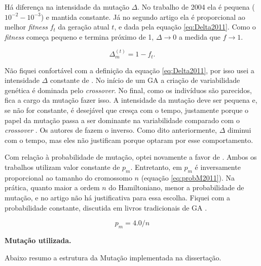 	Há diferença na intensidade da mutação $\Delta$. No trabalho de 2004 ela é pequena ($10^{-2}-10^{-3}$) e mantida constante. Já no segundo artigo ela é proporcional ao melhor \emph{fitness} $f_t$ da geração atual $t$, e dada pela equação \ref{eq:Delta2011}. Como o \emph{fitness} começa pequeno e termina próximo de 1, $\Delta \rightarrow 0$ a medida que $f \rightarrow 1$.

\begin{equation}\label{eq:Delta2011}
	\Delta^{(t)}_m =  1 - f_t.
\end{equation}	

	Não fiquei confortável com a definição da equação \ref{eq:Delta2011}, por isso usei a intensidade $\Delta$ constante de \cite{metodo2004}. No início de um GA a criação de variabilidade genética é dominada pelo \emph{crossover}. No final, como os indivíduos são parecidos, fica a cargo da mutação fazer isso. A intensidade da mutação deve ser pequena e, se não for constante, é desejável que cresça com o tempo, justamente porque o papel da mutação passa a ser dominante na variabilidade comparado com o \emph{crossover} \cite{Linden2008}. Os autores de \cite{metodo2011} fazem o inverso. Como dito anteriormente, $\Delta$ diminui com o tempo, mas eles não justificam porque optaram por esse comportamento.
	
	Com relação à probabilidade de mutação, optei novamente a favor de \cite{metodo2004}. Ambos os trabalhos utilizam valor constante de $p_m$. Entretanto, em \cite{metodo2011} $p_m$ é inversamente proporcional ao tamanho do cromossomo $n$ (equação \ref{eq:probM2011}). Na prática, quanto maior a ordem $n$ do Hamiltoniano, menor a probabilidade de mutação, e no artigo não há justificativa para essa escolha. Fiquei com a probabilidade constante, discutida em livros tradicionais de GA \cite{Mitchell98, Linden2008}.

	\begin{equation}\label{eq:probM2011}
		p_m = 4.0/n
	\end{equation}


	\textbf{Mutação utilizada.}
	
	Abaixo resumo a estrutura da Mutação implementada na dissertação.
	
